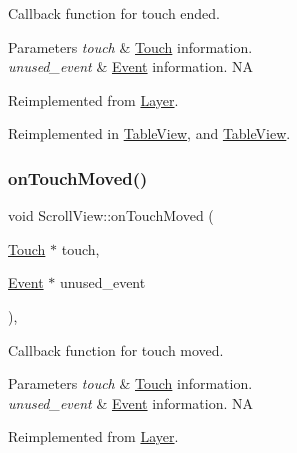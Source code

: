 Callback function for touch ended.


\begin{DoxyParams}{Parameters}
{\em touch} & \hyperlink{classTouch}{Touch} information. \\
\hline
{\em unused\+\_\+event} & \hyperlink{classEvent}{Event} information.  NA \\
\hline
\end{DoxyParams}


Reimplemented from \hyperlink{classLayer_a9dbcca0eab3b0cd3cdc279615c604413}{Layer}.



Reimplemented in \hyperlink{classTableView_a0d96aaf8ac40256ed144565beaaf76aa}{Table\+View}, and \hyperlink{classTableView_a361d91c5c592b3d81ed43b6743487fc3}{Table\+View}.

\mbox{\label{classScrollView_a0958fd1a06430212b3d3cbe26ce2bb9c}} 
\subsubsection{\texorpdfstring{on\+Touch\+Moved()}{onTouchMoved()}\hspace{0.1cm}{\footnotesize\ttfamily [1/2]}}
{\footnotesize\ttfamily void Scroll\+View\+::on\+Touch\+Moved (\begin{DoxyParamCaption}\item[{\hyperlink{classTouch}{Touch} $\ast$}]{touch,  }\item[{\hyperlink{classEvent}{Event} $\ast$}]{unused\+\_\+event }\end{DoxyParamCaption})\hspace{0.3cm}{\ttfamily [override]}, {\ttfamily [virtual]}}

Callback function for touch moved.


\begin{DoxyParams}{Parameters}
{\em touch} & \hyperlink{classTouch}{Touch} information. \\
\hline
{\em unused\+\_\+event} & \hyperlink{classEvent}{Event} information.  NA \\
\hline
\end{DoxyParams}


Reimplemented from \hyperlink{classLayer_ad614a7a347f171cd6185e7aeef125047}{Layer}.



